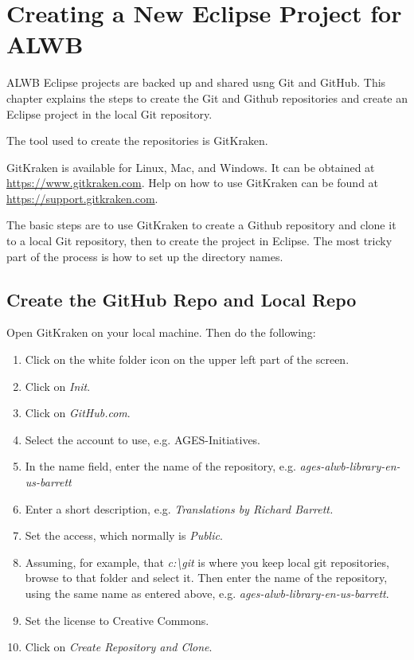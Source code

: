 \documentclass[]{memoir}
\begin{document}
\chapter{Creating a New Eclipse Project for ALWB}

ALWB Eclipse projects are backed up and shared usng Git and GitHub.  This chapter explains the steps to create the Git and Github repositories and create an Eclipse project in the local Git repository.

The tool used to create the repositories is GitKraken.

\begin{boxed}
GitKraken is available for Linux, Mac, and Windows.  It can be obtained at \url{https://www.gitkraken.com}.  Help on how to use GitKraken can be found at 
\url{https://support.gitkraken.com}.
\end{boxed}

The basic steps are to use GitKraken to create a Github repository and clone it to a local Git repository, then to create the project in Eclipse.  The most tricky part of the process is how to set up the directory names.

\section{Create the GitHub Repo and Local Repo}

Open GitKraken on your local machine.  Then do the following:

\begin{enumerate}
    \item Click on the white folder icon on the upper left part of the screen.
    \item Click on \emph{Init}.
    \item Click on \emph{GitHub.com}.
    \item Select the account to use, e.g. AGES-Initiatives.
    \item In the name field, enter the name of the repository, e.g. \emph{ages-alwb-library-en-us-barrett}
    \item Enter a short description, e.g. \emph{Translations by Richard Barrett.}
    \item Set the access, which normally is \emph{Public}.
    \item Assuming, for example, that \emph{c:\textbackslash git} is where you keep local git repositories, browse to that folder and select it.  Then enter the name of the repository, using the same name as entered above, e.g. \emph{ages-alwb-library-en-us-barrett}.  
    \item Set the license to Creative Commons.  
    \item Click on \emph{Create Repository and Clone}.
\end{enumerate}
\end{document}
